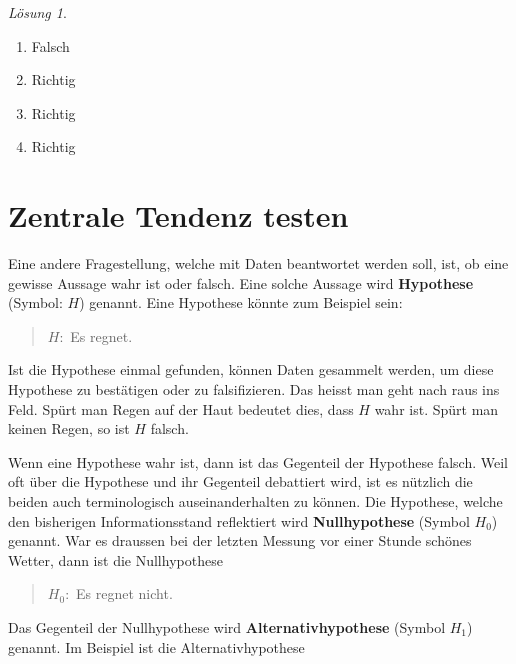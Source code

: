 \documentclass[
]{book}
\providecommand{\tightlist}{%
  \setlength{\itemsep}{0pt}\setlength{\parskip}{0pt}}
\theoremstyle{definition}
\theoremstyle{definition}
\theoremstyle{definition}
\theoremstyle{definition}
\theoremstyle{remark}
\newtheorem*{solution}{Lösung}
\begin{document}
\begin{solution}
\leavevmode

\begin{enumerate}
\def\labelenumi{\alph{enumi})}
\tightlist
\item
  Falsch
\item
  Richtig
\item
  Richtig
\item
  Richtig
\end{enumerate}

\end{solution}

\chapter{Zentrale Tendenz testen}\label{zentrale-tendenz-testen}

Eine andere Fragestellung, welche mit Daten beantwortet werden soll, ist, ob eine gewisse Aussage wahr ist oder falsch. \label{customdef-hypothese}{Eine solche Aussage wird \textbf{Hypothese} (Symbol: \(H\)) genannt.} Eine Hypothese könnte zum Beispiel sein:

\begin{quote}
\(H:\) Es regnet.
\end{quote}

Ist die Hypothese einmal gefunden, können Daten gesammelt werden, um diese Hypothese zu bestätigen oder zu falsifizieren. Das heisst man geht nach raus ins Feld. Spürt man Regen auf der Haut bedeutet dies, dass \(H\) wahr ist. Spürt man keinen Regen, so ist \(H\) falsch.

Wenn eine Hypothese wahr ist, dann ist das Gegenteil der Hypothese falsch. Weil oft über die Hypothese und ihr Gegenteil debattiert wird, ist es nützlich die beiden auch terminologisch auseinanderhalten zu können. \label{customdef-nullhypothese}{Die Hypothese, welche den bisherigen Informationsstand reflektiert wird \textbf{Nullhypothese} (Symbol \(H_0\)) genannt.} War es draussen bei der letzten Messung vor einer Stunde schönes Wetter, dann ist die Nullhypothese

\begin{quote}
\(H_0:\) Es regnet nicht.
\end{quote}

\label{customdef-alternativhypothese}{Das Gegenteil der Nullhypothese wird \textbf{Alternativhypothese} (Symbol \(H_1\)) genannt.} Im Beispiel ist die Alternativhypothese
\end{document}
